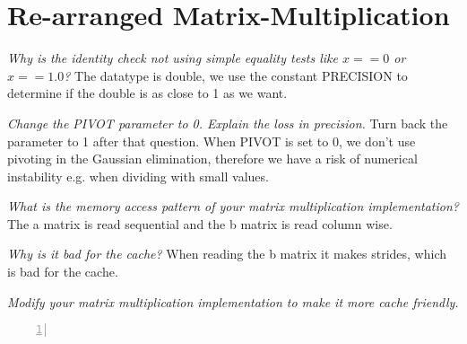 \documentclass{article}
\begin{document}
\section{Re-arranged Matrix-Multiplication}

\begin{ExerciseList}
\Exercise
{}

\Question
\emph{Why is the identity check not using simple equality tests
  like $x==0$ or $x==1.0$?}
\Answer The datatype is double, we use the constant PRECISION to determine if the double is as close to 1 as we want.

\Question
\emph{Change the PIVOT parameter to 0. Explain the loss in precision.}
Turn back the parameter to 1 after that question.
\Answer When PIVOT is set to 0, we don't use pivoting in the Gaussian elimination, therefore we have a risk of numerical instability e.g. when dividing with
small values.

\Question
\emph{What is the memory access pattern of your matrix multiplication
  implementation?}
\Answer The a matrix is read sequential and the b matrix is read column wise.

\Question
\emph{Why is it bad for the cache?}
\Answer When reading the b matrix it makes strides, which is bad for the cache.

\Question
\emph{Modify your matrix multiplication implementation to make it more
  cache friendly.}

\begin{lstlisting}[basicstyle=\small\sffamily,
keywords={break,case,const,continue,default,else,enum,
for,if,return,switch,while,do,long,void,int,float,double,
char,struct,typedef,include,size\_t},
keywordstyle={\color{blue}},
comment={[l]{//}}, morecomment={[s]{/*}{*/}}, commentstyle=\itshape,
columns={[l]flexible}, numbers=left, numberstyle=\tiny,
frameround=fftt, frame=shadowbox, captionpos=b,
caption={Matrix multiplication function.},
label=LST:MatMulFunc2]


\end{lstlisting}
\end{ExerciseList}
\end{document}
